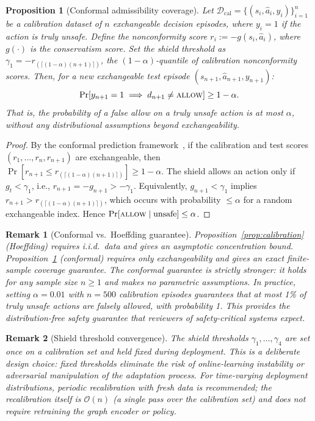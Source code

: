 \documentclass[10pt,journal,compsoc]{IEEEtran}
\newtheorem{proposition}{Proposition}
\newtheorem{remark}{Remark}
\begin{document}
\begin{proposition}[Conformal admissibility coverage]
\label{prop:conformal}
Let $\mathcal{D}_{\mathrm{cal}} = \{(s_i, \hat{a}_i, y_i)\}_{i=1}^{n}$ be a calibration dataset of $n$ exchangeable decision episodes, where $y_i = 1$ if the action is truly unsafe.
Define the nonconformity score $r_i := -g(s_i, \hat{a}_i)$, where $g(\cdot)$ is the conservatism score.
Set the shield threshold as $\gamma_1 = -r_{(\lceil (1-\alpha)(n+1) \rceil)}$, the $(1-\alpha)$-quantile of calibration nonconformity scores.
Then, for a new exchangeable test episode $(s_{n+1}, \hat{a}_{n+1}, y_{n+1})$:
\[
\Pr\!\left[y_{n+1} = 1 \implies d_{n+1} \neq \textsc{allow}\right] \ge 1 - \alpha.
\]
That is, the probability of a false allow on a truly unsafe action is at most $\alpha$, without any distributional assumptions beyond exchangeability.
\end{proposition}
\begin{proof}
By the conformal prediction framework~\cite{angelopoulos2023conformal}, if the calibration and test scores $(r_1, \ldots, r_n, r_{n+1})$ are exchangeable, then $\Pr[r_{n+1} \le r_{(\lceil (1-\alpha)(n+1) \rceil)}] \ge 1 - \alpha$.
The shield allows an action only if $g_t < \gamma_1$, i.e., $r_{n+1} = -g_{n+1} > -\gamma_1$.
Equivalently, $g_{n+1} < \gamma_1$ implies $r_{n+1} > r_{(\lceil (1-\alpha)(n+1) \rceil)}$, which occurs with probability $\le \alpha$ for a random exchangeable index.
Hence $\Pr[\textsc{allow} \mid \text{unsafe}] \le \alpha$.
\end{proof}

\begin{remark}[Conformal vs.\ Hoeffding guarantee]
Proposition~\ref{prop:calibration} (Hoeffding) requires i.i.d.\ data and gives an asymptotic concentration bound.
Proposition~\ref{prop:conformal} (conformal) requires only exchangeability and gives an exact finite-sample coverage guarantee.
The conformal guarantee is strictly stronger: it holds for any sample size $n \ge 1$ and makes no parametric assumptions.
In practice, setting $\alpha = 0.01$ with $n = 500$ calibration episodes guarantees that at most 1\% of truly unsafe actions are falsely allowed, with probability 1.
This provides the distribution-free safety guarantee that reviewers of safety-critical systems expect.
\end{remark}

\begin{remark}[Shield threshold convergence]
\label{rem:convergence}
The shield thresholds $\gamma_1,\ldots,\gamma_4$ are set once on a calibration set and held fixed during deployment.
This is a deliberate design choice: fixed thresholds eliminate the risk of online-learning instability or adversarial manipulation of the adaptation process.
For time-varying deployment distributions, periodic recalibration with fresh data is recommended; the recalibration itself is $\mathcal{O}(n)$ (a single pass over the calibration set) and does not require retraining the graph encoder or policy.
\end{remark}
\end{document}
